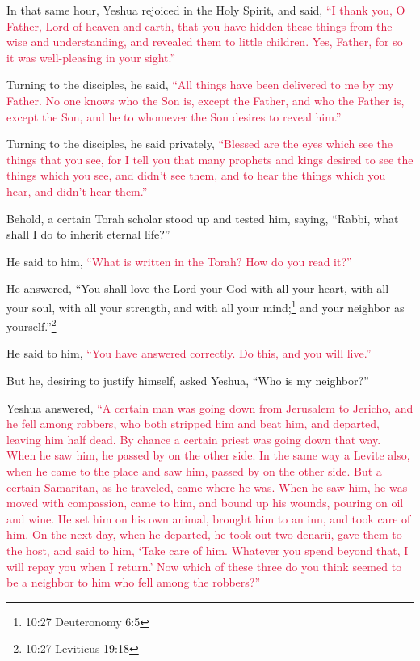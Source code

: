 \myverse{}In that same hour, Yeshua rejoiced in the Holy Spirit, and said,
\textcolor{crimson}{“I thank you, O Father, Lord of heaven and earth, that you have hidden these things from the wise
	and understanding, and revealed them to little children. Yes, Father, for so it was well-pleasing in your
	sight.”}

\myverse{}Turning to the disciples, he said,
\textcolor{crimson}{“All things have been delivered to me by my Father. No one knows who the Son is, except the Father,
	and who the Father is, except the Son, and he to whomever the Son desires to reveal him.”}

\myverse{}Turning to the disciples, he said privately,
\textcolor{crimson}{“Blessed are the eyes which see the things that you see,
}
\myverse{}\textcolor{crimson}{for I tell you that many prophets and kings desired to see the things
	which you see, and didn’t see them, and to hear the things which you hear, and didn’t hear them.”}

\myverse{}Behold, a certain Torah scholar stood up and tested him, saying,
“Rabbi, what shall I do to inherit eternal life?”

\myverse{}He said to him,
\textcolor{crimson}{“What is written in the Torah? How do you read it?”
}

\myverse{}He answered, “You shall love the Lord your God with all your
heart, with all your soul, with all your strength, and with all your mind;\footnote{ 10:27 Deuteronomy 6:5} and your neighbor as yourself.”\footnote{ 10:27 Leviticus 19:18}

\myverse{}He said to him,
\textcolor{crimson}{“You have answered correctly. Do this, and you will live.”}

\myverse{}But he, desiring to justify himself, asked Yeshua, “Who is my
neighbor?”

\myverse{}Yeshua answered,
\textcolor{crimson}{“A certain man was going down from Jerusalem to Jericho, and he fell among robbers, who both stripped
	him and beat him, and departed, leaving him half dead.
}
\myverse{}\textcolor{crimson}{By chance a certain priest was going down that way. When he saw him,
	he passed by on the other side.
}
\myverse{}\textcolor{crimson}{In the same way a Levite also, when he came to the place and saw him,
	passed by on the other side.
}
\myverse{}\textcolor{crimson}{But a certain Samaritan, as he traveled, came where he was. When he saw
	him, he was moved with compassion,
}
\myverse{}\textcolor{crimson}{came to him, and bound up his wounds, pouring on oil and wine. He set
	him on his own animal, brought him to an inn, and took care of him.
}
\myverse{}\textcolor{crimson}{On the next day, when he departed, he took out two denarii, gave them
	to the host, and said to him, ‘Take care of him. Whatever you spend beyond that, I will repay you when
	I return.’
}
\myverse{}\textcolor{crimson}{Now which of these three do you think seemed to be a neighbor to him
	who fell among the robbers?”}

